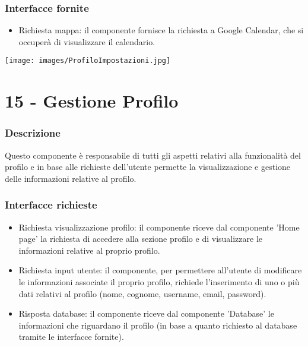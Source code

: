\documentclass[a4paper,12pt]{article}
\begin{document}
\subsubsection*{Interfacce fornite}
\begin{itemize} \setlength\itemsep{0.01em}
\item {\sffamily Richiesta mappa}: il componente fornisce la richiesta a Google Calendar, che si occuperà di visualizzare il calendario.
\end{itemize}

\newpage
\begin{center}
  \texttt{[image: images/ProfiloImpostazioni.jpg]}
\end{center}


\section*{15 -  Gestione Profilo}
\subsubsection*{Descrizione}
Questo componente è responsabile di tutti gli aspetti relativi alla funzionalità del profilo e in base alle richieste dell'utente permette la visualizzazione e gestione delle informazioni relative al profilo.
\subsubsection*{Interfacce richieste}
\begin{itemize} \setlength\itemsep{0.01em}
\item {\sffamily Richiesta visualizzazione profilo}: il componente riceve dal componente 'Home page'  la richiesta di accedere alla sezione profilo e di visualizzare le informazioni relative al proprio profilo.
\item {\sffamily Richiesta input utente}:  il componente, per permettere all'utente di modificare le informazioni associate il proprio profilo, richiede l'inserimento di uno o più dati relativi al profilo (nome, cognome, username, email, password).
\item {\sffamily Risposta database}: il componente riceve dal componente 'Database' le informazioni che riguardano il profilo (in base a quanto richiesto al database tramite le interfacce fornite).

\end{itemize}
\end{document}
